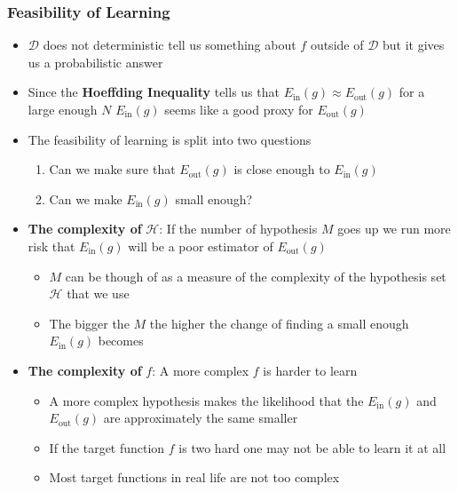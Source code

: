 \documentclass[11pt]{article}
\begin{document}
\subsubsection{Feasibility of Learning}
\label{sec:org6cac7d6}
\begin{itemize}
\item \(\mathcal D\) does not deterministic tell us something about \(f\) outside of \(\mathcal D\) but it gives us a probabilistic answer
\item Since the \textbf{Hoeffding Inequality} tells us that \(E_\text{in}(g) \approx E_\text{out}(g)\) for a large enough \(N\) \(E_\text{in}(g)\) seems like a good proxy for \(E_\text{out}(g)\)

\item The feasibility of learning is split into two questions
\begin{enumerate}
\item Can we make sure that \(E_\text{out}(g)\) is close enough to \(E_\text{in}(g)\)
\item Can we make \(E_\text{in}(g)\) small enough?
\end{enumerate}

\item \textbf{The complexity of} \(\mathcal H\): If the number of hypothesis \(M\) goes up we run more risk that \(E_\text{in}(g)\) will be a poor estimator of \(E_\text{out}(g)\)
\begin{itemize}
\item \(M\) can be though of as a measure of the complexity of the hypothesis set \(\mathcal H\) that we use
\item The bigger the \(M\) the higher the change of finding a small enough \(E_\text{in}(g)\) becomes
\end{itemize}

\item \textbf{The complexity of} \(f\): A more complex \(f\) is harder to learn
\begin{itemize}
\item A more complex hypothesis makes the likelihood that the \(E_\text{in}(g)\) and \(E_\text{out}(g)\) are approximately the same smaller
\item If the target function \(f\) is two hard one may not be able to learn it at all
\item Most target functions in real life are not too complex
\end{itemize}
\end{itemize}
\end{document}
